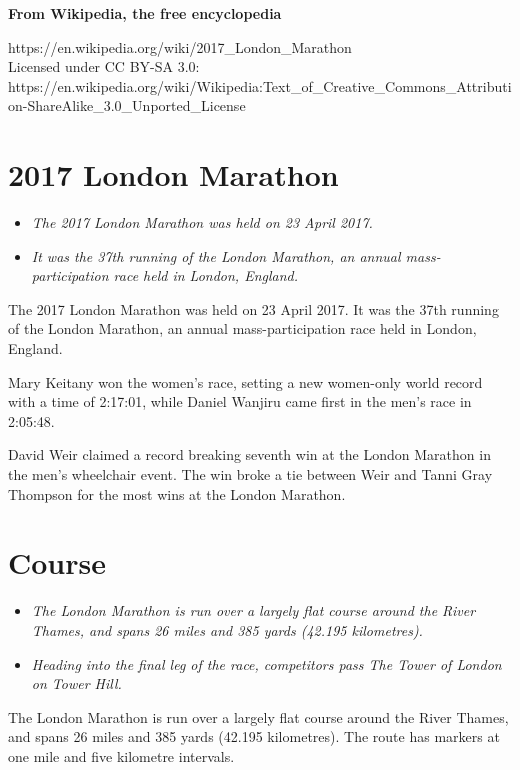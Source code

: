 \textbf{From Wikipedia, the free encyclopedia}

https://en.wikipedia.org/wiki/2017\_London\_Marathon\\
Licensed under CC BY-SA 3.0:\\
https://en.wikipedia.org/wiki/Wikipedia:Text\_of\_Creative\_Commons\_Attribution-ShareAlike\_3.0\_Unported\_License

\section{2017 London Marathon}\label{london-marathon}

\begin{itemize}
\item
  \emph{The 2017 London Marathon was held on 23 April 2017.}
\item
  \emph{It was the 37th running of the London Marathon, an annual
  mass-participation race held in London, England.}
\end{itemize}

The 2017 London Marathon was held on 23 April 2017. It was the 37th
running of the London Marathon, an annual mass-participation race held
in London, England.

Mary Keitany won the women's race, setting a new women-only world record
with a time of 2:17:01, while Daniel Wanjiru came first in the men's
race in 2:05:48.

David Weir claimed a record breaking seventh win at the London Marathon
in the men's wheelchair event. The win broke a tie between Weir and
Tanni Gray Thompson for the most wins at the London Marathon.

\section{Course}\label{course}

\begin{itemize}
\item
  \emph{The London Marathon is run over a largely flat course around the
  River Thames, and spans 26 miles and 385 yards (42.195 kilometres).}
\item
  \emph{Heading into the final leg of the race, competitors pass The
  Tower of London on Tower Hill.}
\end{itemize}

The London Marathon is run over a largely flat course around the River
Thames, and spans 26 miles and 385 yards (42.195 kilometres). The route
has markers at one mile and five kilometre intervals.

